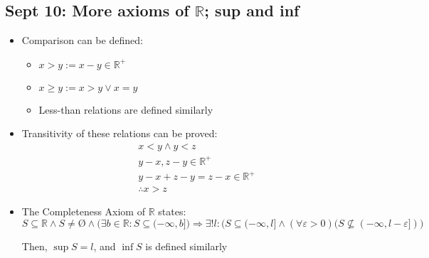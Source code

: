 \documentclass[10pt, oneside]{article}
\let\geq\geqslant
\newcommand{\R}{\mathbb{R}}
\let \foo \O
\renewcommand{\O}{\text{\foo}}
\begin{document}
\subsection{Sept 10: More axioms of $\R$; sup and inf}
\begin {itemize}
    \item Comparison can be defined:
    \begin {itemize}
        \item $x>y := x-y\in \R^+$
        \item $x\geq y := x>y \lor x=y$
        \item Less-than relations are defined similarly
    \end{itemize}
    \item Transitivity of these relations can be proved:
    \begin{align*}
        &x<y\land y<z\\
        &y-x,z-y \in \R^+\\
        &y-x+z-y=z-x \in \R^+\\
        &\therefore x>z
    \end{align*}
    \item The Completeness Axiom of $\R$ states:
        \[S \subseteq \R \land S \neq \O \land \Big( \exists b \in \R : S \subseteq (-\infty,b] \Big) \Rightarrow \exists! l : \Big( S\subseteq (-\infty,l] \land (\forall \varepsilon > 0) (S \not\subseteq (-\infty,l-\varepsilon]) \Big)\]
    
    Then, $\sup S = l$, and $\inf S$ is defined similarly
\end{itemize}
\end{document}
